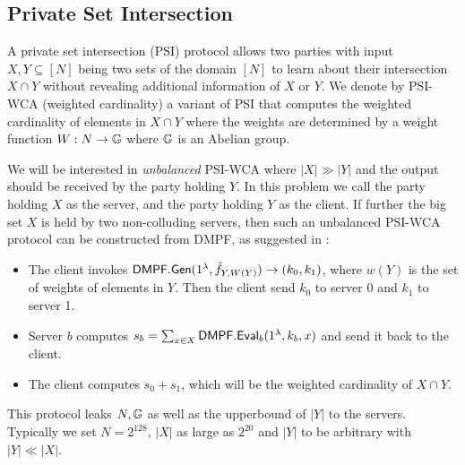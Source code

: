 \subsection{Private Set Intersection}\label{sec:PSI_prelim}
A private set intersection (PSI) protocol \cite{freedman_efficient_2004} allows two parties with input $X,Y\subseteq [N]$ being two sets of the domain $[N]$ to learn about their intersection $X\cap Y$ without revealing additional information of $X$ or $Y$. We denote by PSI-WCA (weighted cardinality) a variant of PSI that computes the weighted cardinality of elements in $X\cap Y$ where the weights are determined by a weight function $W:N\rightarrow \mathbb{G}$ where $\mathbb{G}$ is an Abelian group. 

We will be interested in \emph{unbalanced} PSI-WCA where $|X|\gg |Y|$ and the output should be received by the party holding $Y$. In this problem we call the party holding $X$ as the server, and the party holding $Y$ as the client. If further the big set $X$ is held by two non-colluding servers, then such an unbalanced PSI-WCA protocol can be constructed from DMPF, as suggested in \cite{cryptoeprint:2020/1599}: 
\begin{itemize}
  \item The client invokes ${\sf DMPF}.{\sf Gen}(1^\lambda, \hat{f}_{Y,W(Y)})\rightarrow (k_0,k_1)$, where $w(Y)$ is the set of weights of elements in $Y$. Then the client send $k_0$ to server 0 and $k_1$ to server 1. 
  \item Server $b$ computes $s_b=\sum_{x\in X}{\sf DMPF}.{\sf Eval}_b(1^\lambda, k_b,x)$ and send it back to the client. 
  \item The client computes $s_0+s_1$, which will be the weighted cardinality of $X\cap Y$. 
\end{itemize}
This protocol leaks $N,\mathbb{G}$ as well as the upperbound of $|Y|$ to the servers. Typically we set $N = 2^{128}$, $|X|$ as large as $2^{20}$ and $|Y|$ to be arbitrary with $|Y|\ll |X|$. 
